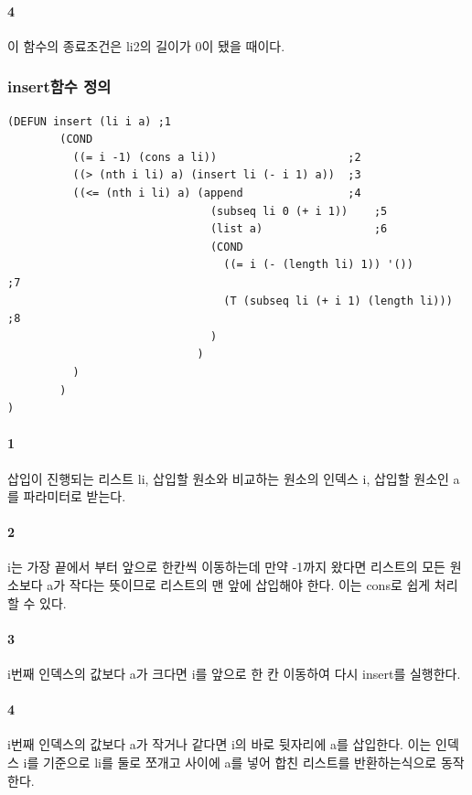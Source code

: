 \documentclass{oblivoir}
\begin{document}
\paragraph*{4}
이 함수의 종료조건은 li2의 길이가 0이 됐을 때이다.

\subsubsection{insert함수 정의}
\begin{verbatim}
(DEFUN insert (li i a) ;1
        (COND
          ((= i -1) (cons a li))                    ;2
          ((> (nth i li) a) (insert li (- i 1) a))  ;3
          ((<= (nth i li) a) (append                ;4
                               (subseq li 0 (+ i 1))    ;5
                               (list a)                 ;6
                               (COND                    
                                 ((= i (- (length li) 1)) '())          ;7
                                 (T (subseq li (+ i 1) (length li)))    ;8
                               )
                             )
          )
        )
)
\end{verbatim}

\paragraph*{1}
삽입이 진행되는 리스트 li, 삽입할 원소와 비교하는 원소의 인덱스 i, 삽입할 원소인 a를 파라미터로 받는다.

\paragraph*{2}
i는 가장 끝에서 부터 앞으로 한칸씩 이동하는데 만약 -1까지 왔다면 리스트의 모든 원소보다 a가 작다는 뜻이므로 리스트의 맨 앞에 삽입해야 한다. 이는 cons로 쉽게 처리할 수 있다.

\paragraph*{3}
i번째 인덱스의 값보다 a가 크다면 i를 앞으로 한 칸 이동하여 다시 insert를 실행한다.

\paragraph*{4}
i번째 인덱스의 값보다 a가 작거나 같다면 i의 바로 뒷자리에 a를 삽입한다.
이는 인덱스 i를 기준으로 li를 둘로 쪼개고 사이에 a를 넣어 합친 리스트를 반환하는식으로 동작한다.
\end{document}
